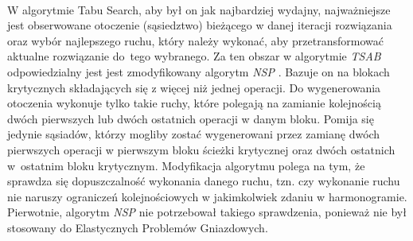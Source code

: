 \documentclass[printmode,oneside]{mgr}
\begin{document}
\ \\W algorytmie Tabu Search, aby był on jak najbardziej wydajny, najważniejsze jest obserwowane otoczenie (sąsiedztwo) bieżącego w danej iteracji rozwiązania oraz wybór najlepszego ruchu, który należy wykonać, aby przetransformować aktualne rozwiązanie do~tego wybranego. Za ten obszar w algorytmie \emph{TSAB} odpowiedzialny jest jest zmodyfikowany algorytm \emph{NSP} \cite{Smutnicki96}. Bazuje on na blokach krytycznych składających się z więcej niż jednej operacji. Do wygenerowania otoczenia wykonuje tylko takie ruchy, które polegają na zamianie kolejnością dwóch pierwszych lub dwóch ostatnich operacji w danym bloku. Pomija się jedynie sąsiadów, którzy mogliby zostać wygenerowani przez zamianę dwóch pierwszych operacji w pierwszym bloku ścieżki krytycznej oraz dwóch ostatnich w~ostatnim bloku krytycznym. Modyfikacja algorytmu polega na tym, że sprawdza się dopuszczalność wykonania danego ruchu, tzn. czy wykonanie ruchu nie naruszy ograniczeń kolejnościowych w jakimkolwiek zdaniu w harmonogramie. Pierwotnie, algorytm \emph{NSP} nie potrzebował takiego sprawdzenia, ponieważ nie był stosowany do Elastycznych Problemów Gniazdowych.
\end{document}
